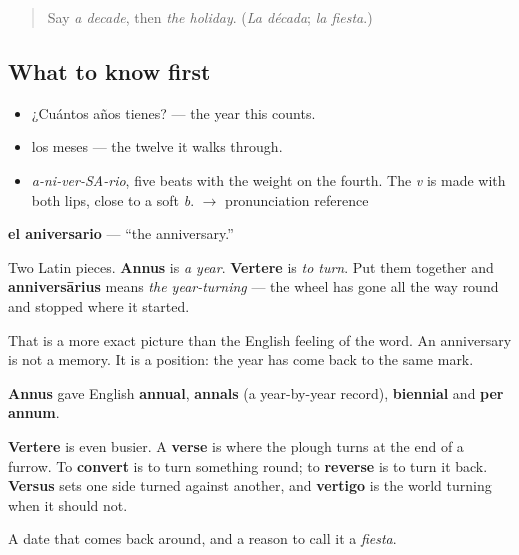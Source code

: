 \label{lesson:ES-C349-aniversario}



\begin{quote}
Say \emph{a decade}, then \emph{the holiday}. (\emph{La década}; \emph{la fiesta}.)
\end{quote}

\subsection*{What to know first}
\begin{itemize}
\raggedright
  \item ¿Cuántos años tienes? — the year this counts.
  \item los meses — the twelve it walks through.
\end{itemize}

\begin{sounds}
\begin{itemize}
\raggedright
  \item \emph{a-ni-ver-SA-rio}, five beats with the weight on the fourth. The \emph{v} is made with both lips, close to a soft \emph{b}. $\to$ pronunciation reference
\end{itemize}
\end{sounds}

\begin{cousinweb}
\textbf{el aniversario} — \textquotedblleft{}the anniversary.\textquotedblright{}

Two Latin pieces. \textbf{Annus} is \emph{a year}. \textbf{Vertere} is \emph{to turn}. Put them together and \textbf{anniversārius} means \emph{the year-turning} — the wheel has gone all the way round and stopped where it started.

That is a more exact picture than the English feeling of the word. An anniversary is not a memory. It is a position: the year has come back to the same mark.

\textbf{Annus} gave English \textbf{annual}, \textbf{annals} (a year-by-year record), \textbf{biennial} and \textbf{per annum}.

\textbf{Vertere} is even busier. A \textbf{verse} is where the plough turns at the end of a furrow. To \textbf{convert} is to turn something round; to \textbf{reverse} is to turn it back. \textbf{Versus} sets one side turned against another, and \textbf{vertigo} is the world turning when it should not.
\end{cousinweb}

\begin{grammarlens}[title={What you've built}]
A date that comes back around, and a reason to call it a \emph{fiesta}.
\end{grammarlens}

